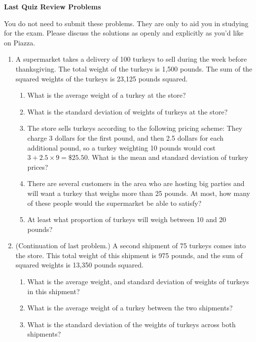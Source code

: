 \documentclass[11pt]{article}
\begin{document}
\centerline{\textbf{Last Quiz Review Problems}}
You do not need to submit these problems. They are only to aid you in studying for the exam. Please discuss the solutions as openly and explicitly as you'd like on Piazza.

\begin{enumerate}
\item A supermarket takes a delivery of 100 turkeys to sell during the week before thanksgiving.
The total weight of the turkeys is 1,500 pounds. The sum of the squared weights of the turkeys is 23,125 pounds squared.
\begin{enumerate}
    \item What is the average weight of a turkey at the store?
    \item What is the standard deviation of weights of turkeys at the store?
    \item The store sells turkeys according to the following pricing scheme: They charge 3 dollars for the first pound, and then 2.5 dollars for each additional pound, so
        a turkey weighting 10 pounds would cost $3 + 2.5 \times 9 = \$25.50$. What is the mean and standard deviation of turkey prices?
    \item There are several customers in the area who are hosting big parties and will want a turkey that weighs more than 25 pounds.
        At most, how many of these people would the supermarket be able to satisfy?
    \item At least what proportion of turkeys will weigh between 10 and 20 pounds?
\end{enumerate}

\item (Continuation of last problem.) A second shipment of 75 turkeys comes into the store. This total weight of this shipment is 975 pounds, and the sum of squared weights is 13,350 pounds squared.
\begin{enumerate}
    \item What is the average weight, and standard deviation of weights of turkeys in this shipment?
    \item What is the average weight of a turkey between the two shipments?
    \item What is the standard deviation of the weights of turkeys across both shipments? 
\end{enumerate}


\end{enumerate}
\end{document}
